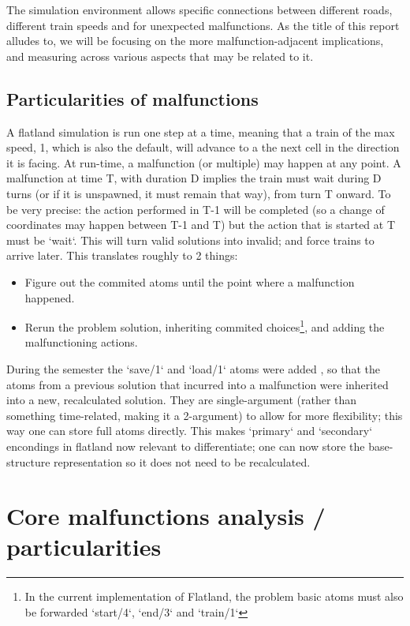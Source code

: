 \documentclass[runningheads]{llncs}
\begin{document}
The simulation environment allows specific connections between different roads, different train speeds and for unexpected malfunctions. As the title of this report alludes to, we will be focusing on the more malfunction-adjacent implications, and measuring across various aspects that may be related to it.


\subsection{Particularities of malfunctions}

A flatland simulation is run one step at a time, meaning that a train of the max speed, 1, which is also the default, will advance to a the next cell in the direction it is facing. At run-time, a malfunction (or multiple) may happen at any point. A malfunction at time T, with duration D implies the train must wait during D turns (or if it is unspawned, it must remain that way), from turn T onward. To be very precise: the action performed in T-1 will be completed (so a change of coordinates may happen between T-1 and T) but the action that is started at T must be `wait`. This will turn valid solutions into invalid; and force trains to arrive later. This translates roughly to 2 things:
\begin{itemize}
	\item Figure out the commited atoms until the point where a malfunction happened.
	\item Rerun the problem solution, inheriting commited choices\footnote{In the current implementation of Flatland, the problem basic atoms must also be forwarded `start/4`, `end/3` and `train/1`}, and adding the malfunctioning actions.
\end{itemize}


During the semester the `save/1`  and `load/1` atoms were added \cite{malfunction_branch}, so that the atoms from a previous solution that incurred into a malfunction were inherited into a new, recalculated solution. They are single-argument (rather than something time-related, making it a 2-argument) to allow for more flexibility; this way one can store full atoms directly. This makes `primary` and `secondary` encondings in flatland now relevant to differentiate; one can now store the base-structure representation so it does not need to be recalculated.


\section{Core malfunctions analysis / particularities}
\end{document}
